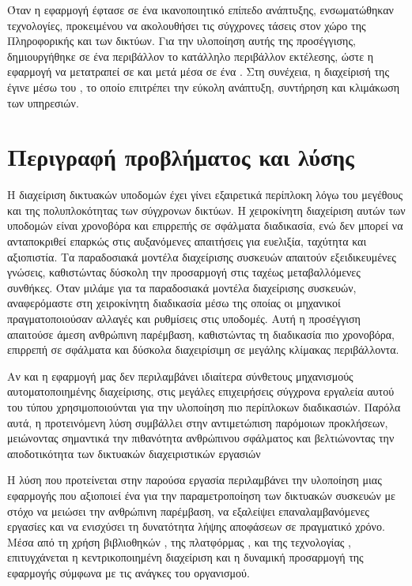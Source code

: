 Όταν η εφαρμογή έφτασε σε ένα ικανοποιητικό επίπεδο ανάπτυξης, ενσωματώθηκαν  τεχνολογίες, προκειμένου να ακολουθήσει τις σύγχρονες τάσεις στον χώρο της Πληροφορικής και των δικτύων. 
Για την υλοποίηση αυτής της προσέγγισης, δημιουργήθηκε σε ένα  περιβάλλον το κατάλληλο περιβάλλον εκτέλεσης, ώστε η εφαρμογή να μετατραπεί σε  και μετά  μέσα σε ένα . Στη συνέχεια, η διαχείρισή της έγινε μέσω του , το οποίο επιτρέπει την εύκολη ανάπτυξη, συντήρηση και κλιμάκωση των υπηρεσιών.


\section{Περιγραφή προβλήματος και λύσης}
Η διαχείριση δικτυακών υποδομών έχει γίνει εξαιρετικά περίπλοκη λόγω του μεγέθους και της πολυπλοκότητας των σύγχρονων δικτύων. 
Η χειροκίνητη διαχείριση αυτών των υποδομών είναι χρονοβόρα και επιρρεπής σε σφάλματα διαδικασία, ενώ δεν μπορεί να ανταποκριθεί επαρκώς στις 
αυξανόμενες απαιτήσεις για ευελιξία, ταχύτητα και αξιοπιστία. Τα παραδοσιακά μοντέλα διαχείρισης συσκευών απαιτούν εξειδικευμένες γνώσεις, 
καθιστώντας δύσκολη την προσαρμογή στις ταχέως μεταβαλλόμενες συνθήκες. Όταν μιλάμε για τα παραδοσιακά μοντέλα διαχείρισης συσκευών, αναφερόμαστε στη χειροκίνητη διαδικασία μέσω της οποίας οι μηχανικοί πραγματοποιούσαν αλλαγές και ρυθμίσεις στις υποδομές. Αυτή η προσέγγιση απαιτούσε άμεση ανθρώπινη παρέμβαση, καθιστώντας τη διαδικασία πιο χρονοβόρα, επιρρεπή σε σφάλματα και δύσκολα διαχειρίσιμη σε μεγάλης κλίμακας περιβάλλοντα. 

Αν και η εφαρμογή μας δεν περιλαμβάνει ιδιαίτερα σύνθετους μηχανισμούς αυτοματοποιημένης διαχείρισης, στις μεγάλες επιχειρήσεις 
σύγχρονα εργαλεία αυτού του τύπου χρησιμοποιούνται για την υλοποίηση πιο περίπλοκων διαδικασιών. Παρόλα αυτά, η προτεινόμενη λύση συμβάλλει στην αντιμετώπιση παρόμοιων προκλήσεων, μειώνοντας σημαντικά την πιθανότητα ανθρώπινου σφάλματος και βελτιώνοντας την αποδοτικότητα των δικτυακών διαχειριστικών εργασιών


Η λύση που προτείνεται στην παρούσα εργασία περιλαμβάνει την υλοποίηση μιας εφαρμογής που αξιοποιεί ένα  για την παραμετροποίηση των δικτυακών συσκευών με στόχο να μειώσει την ανθρώπινη παρέμβαση, να εξαλείψει επαναλαμβανόμενες εργασίες και να ενισχύσει τη δυνατότητα λήψης αποφάσεων σε πραγματικό χρόνο. Μέσα από τη χρήση βιβλιοθηκών , της πλατφόρμας , και της τεχνολογίας , επιτυγχάνεται η κεντρικοποιημένη διαχείριση και η δυναμική προσαρμογή της εφαρμογής σύμφωνα με τις ανάγκες του οργανισμού.

